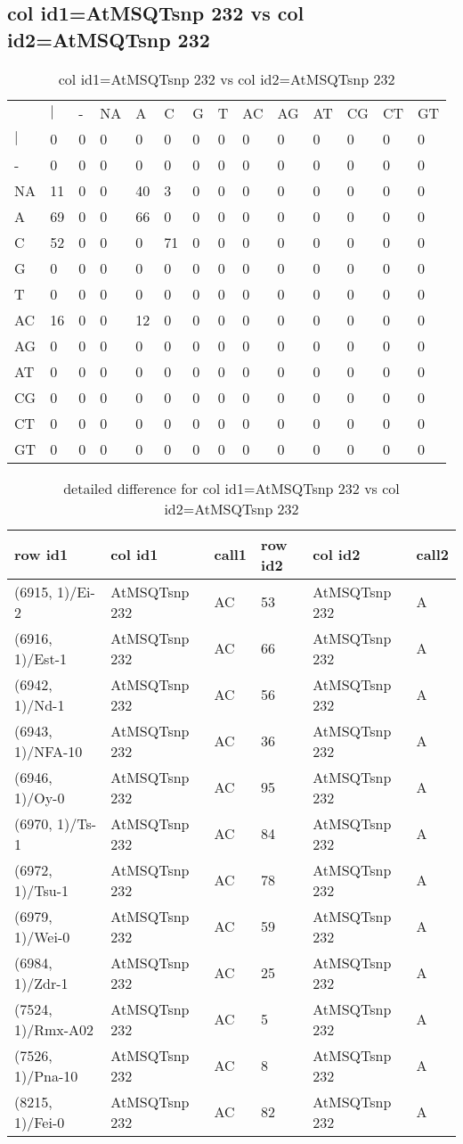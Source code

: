 \subsection{col id1=AtMSQTsnp 232 vs col id2=AtMSQTsnp 232}
\begin{center}
\begin{longtable}{|l|l|l|l|l|l|l|l|l|l|l|l|l|l|}
\caption{col id1=AtMSQTsnp 232 vs col id2=AtMSQTsnp 232} \label{table_dm786}\\
\hline
\\
\hline
&$|$&-&NA&A&C&G&T&AC&AG&AT&CG&CT&GT\\
$|$&0&0&0&0&0&0&0&0&0&0&0&0&0\\
-&0&0&0&0&0&0&0&0&0&0&0&0&0\\
NA&11&0&0&40&3&0&0&0&0&0&0&0&0\\
A&69&0&0&66&0&0&0&0&0&0&0&0&0\\
C&52&0&0&0&71&0&0&0&0&0&0&0&0\\
G&0&0&0&0&0&0&0&0&0&0&0&0&0\\
T&0&0&0&0&0&0&0&0&0&0&0&0&0\\
AC&16&0&0&12&0&0&0&0&0&0&0&0&0\\
AG&0&0&0&0&0&0&0&0&0&0&0&0&0\\
AT&0&0&0&0&0&0&0&0&0&0&0&0&0\\
CG&0&0&0&0&0&0&0&0&0&0&0&0&0\\
CT&0&0&0&0&0&0&0&0&0&0&0&0&0\\
GT&0&0&0&0&0&0&0&0&0&0&0&0&0\\
\hline
\end{longtable}
\end{center}

\begin{center}
\begin{longtable}{|l|l|l|l|l|l|}
\caption{detailed difference for col id1=AtMSQTsnp 232 vs col id2=AtMSQTsnp 232} \label{table_dm787}\\
\hline
row id1&col id1&call1&row id2&col id2&call2\\
\hline
(6915, 1)/Ei-2&AtMSQTsnp 232&AC&53&AtMSQTsnp 232&A\\
(6916, 1)/Est-1&AtMSQTsnp 232&AC&66&AtMSQTsnp 232&A\\
(6942, 1)/Nd-1&AtMSQTsnp 232&AC&56&AtMSQTsnp 232&A\\
(6943, 1)/NFA-10&AtMSQTsnp 232&AC&36&AtMSQTsnp 232&A\\
(6946, 1)/Oy-0&AtMSQTsnp 232&AC&95&AtMSQTsnp 232&A\\
(6970, 1)/Ts-1&AtMSQTsnp 232&AC&84&AtMSQTsnp 232&A\\
(6972, 1)/Tsu-1&AtMSQTsnp 232&AC&78&AtMSQTsnp 232&A\\
(6979, 1)/Wei-0&AtMSQTsnp 232&AC&59&AtMSQTsnp 232&A\\
(6984, 1)/Zdr-1&AtMSQTsnp 232&AC&25&AtMSQTsnp 232&A\\
(7524, 1)/Rmx-A02&AtMSQTsnp 232&AC&5&AtMSQTsnp 232&A\\
(7526, 1)/Pna-10&AtMSQTsnp 232&AC&8&AtMSQTsnp 232&A\\
(8215, 1)/Fei-0&AtMSQTsnp 232&AC&82&AtMSQTsnp 232&A\\
\hline
\end{longtable}
\end{center}

